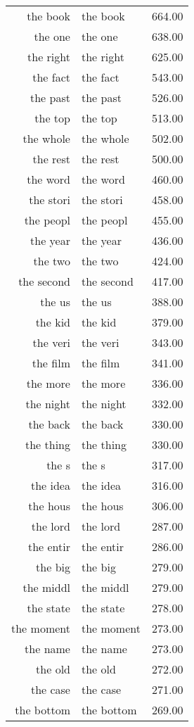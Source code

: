 \begin{table}[ht]
\begin{tabular}{rlr}
  the book & the book & 664.00 \\ 
  the one & the one & 638.00 \\ 
  the right & the right & 625.00 \\ 
  the fact & the fact & 543.00 \\ 
  the past & the past & 526.00 \\ 
  the top & the top & 513.00 \\ 
  the whole & the whole & 502.00 \\ 
  the rest & the rest & 500.00 \\ 
  the word & the word & 460.00 \\ 
  the stori & the stori & 458.00 \\ 
  the peopl & the peopl & 455.00 \\ 
  the year & the year & 436.00 \\ 
  the two & the two & 424.00 \\ 
  the second & the second & 417.00 \\ 
  the us & the us & 388.00 \\ 
  the kid & the kid & 379.00 \\ 
  the veri & the veri & 343.00 \\ 
  the film & the film & 341.00 \\ 
  the more & the more & 336.00 \\ 
  the night & the night & 332.00 \\ 
  the back & the back & 330.00 \\ 
  the thing & the thing & 330.00 \\ 
  the s & the s & 317.00 \\ 
  the idea & the idea & 316.00 \\ 
  the hous & the hous & 306.00 \\ 
  the lord & the lord & 287.00 \\ 
  the entir & the entir & 286.00 \\ 
  the big & the big & 279.00 \\ 
  the middl & the middl & 279.00 \\ 
  the state & the state & 278.00 \\ 
  the moment & the moment & 273.00 \\ 
  the name & the name & 273.00 \\ 
  the old & the old & 272.00 \\ 
  the case & the case & 271.00 \\ 
  the bottom & the bottom & 269.00 \\ 

\end{tabular}
\end{table}
